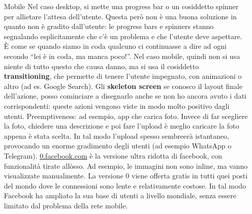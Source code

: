 \begin{enumerate}

\item[Mobile] Nel caso desktop, si mette una progress bar o un cosiddetto spinner per allietare l'attesa dell'utente. Questa per\`o non \`e una buona soluzione in quanto non \`e gradito dall'utente: le progress bars e spinners stanno segnalando esplicitamente che c'\`e un problema e che l'utente deve aspettare. \`E come se quando siamo in coda qualcuno ci continuasse a dire ad ogni secondo ``lei \`e in coda, ma manca poco!''. Nel caso mobile, quindi non si usa niente di tutto questo che causa danno, ma si usa il cosiddetto \textbf{transitioning}, che permette di tenere l'utente impegnato, con animazioni o altro (ad es. Google Search). Gli \textbf{skeleton screen} se conosco il layout finale dell'azione, posso cominciare a disegnarlo anche se non ho ancora avuto i dati corrispondenti: queste azioni vengono viste in modo molto positivo dagli utenti.  Preemptiveness: ad esempio, app che carica foto. Invece di far scegliere la foto, chiedere una descrizione e poi fare l'upload \`e meglio caricare la foto appena \`e stata scelta. In tal modo l'upload spesso sembreer\`a istantaneo, provocando un enorme gradimento degli utenti (ad esempio WhatsApp o Telegram). \url{0.facebook.com} \`e la versione ultra ridotta di facebook, con funzionalit\`a tirate all\`osso. Ad esempio, le immagini non sono inline, ma vanno visualizzate manualmente. La versione 0 viene offerta gratis in tutti quei posti del mondo dove le connessioni sono lente e relativamente costose. In tal modo Facebook ha ampliato la sua base di utenti a livello mondiale, senza essere limitato dal problema della rete mobile.


\end{enumerate}
